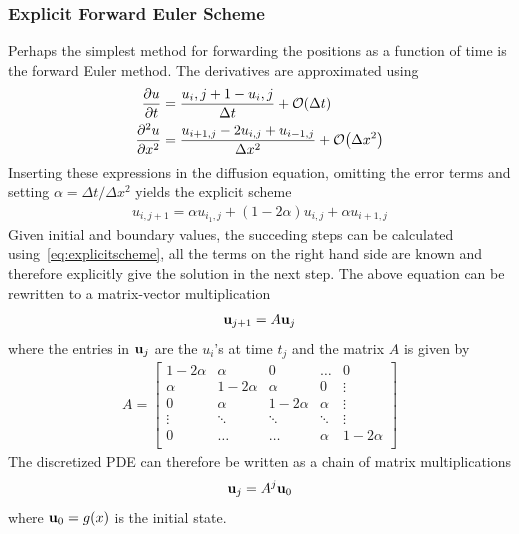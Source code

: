 \documentclass[aps,reprint]{revtex4-1}
\newcommand{\bigO}[1]{\ensuremath{\mathop{}\mathopen{}\mathcal{O}\mathopen{}\left(#1\right)}}
\begin{document}
\subsubsection{Explicit Forward Euler Scheme}
Perhaps the simplest method for forwarding the positions as a function of time
is the forward Euler method. The derivatives are approximated using
\begin{align*}
  \pdv{u}{t} &= \frac{u_i,j+1 - u_i,j}{\Delta{t}} + \bigO{\Delta{t}} \\
  \pdv[2]{u}{x} &= \frac{u_{i+1,j} - 2 u_{i,j} + u_{i-1, j}}{\Delta{x}^2} + \bigO{\Delta{x}^2}
\end{align*}
Inserting these expressions in the diffusion equation, omitting the error terms
and setting $\alpha = \Delta{t} / \Delta{x}^2$ yields the explicit scheme
\begin{align} \label{eq:explicitscheme}
  u_{i,j+1} = \alpha u_{i_1,j} + (1-2\alpha) u_{i,j} + \alpha u_{i+1,j}
\end{align}
Given initial and boundary values, the succeding steps can be calculated using~\ref{eq:explicitscheme},
all the terms on the right hand side are known and therefore explicitly give
the solution in the next step. The above equation can be rewritten to a matrix-vector
multiplication
\begin{align*}
  \vb{u}_{j+1} = A \vb{u}_j
\end{align*}
where the entries in $\vb{u}_j$ are the $u_i$'s at time $t_j$ and the matrix $A$ is
given by
\begin{align*}
  A = \begin{bmatrix}
        1 - 2\alpha & \alpha      & 0            & \hdots  & 0      \\
        \alpha      & 1 - 2\alpha & \alpha       & 0       & \vdots \\
        0           & \alpha      & 1 - 2\alpha  & \alpha  & \vdots \\
        \vdots      & \ddots      & \ddots       & \ddots  & \vdots \\
        0           & \hdots      & \hdots       & \alpha  & 1 - 2\alpha \\
      \end{bmatrix}
\end{align*}
The discretized PDE can therefore be written as a chain of matrix multiplications
\begin{align*}
  \vb{u}_{j} = A^{j} \vb{u}_0
\end{align*}
where $\vb{u}_0 = g(x)$ is the initial state.
\end{document}
